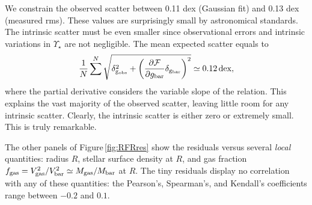 \documentclass[apjl, twocolappendix]{emulateapj}
\begin{document}
We constrain the observed scatter between 0.11 dex (Gaussian fit) and 0.13 dex (measured rms). These values are surprisingly small by astronomical standards. The intrinsic scatter must be even smaller since observational errors and intrinsic variations in $\Upsilon_{\star}$ are not negligible. The mean expected scatter equals to
\begin{equation}
 \dfrac{1}{N}\sum^{N}\sqrt{\delta_{\rm g_{\rm obs}}^2 + \bigg(\dfrac{\partial \mathcal{F}}{\partial g_{\rm bar}} \delta_{\rm g_{\rm bar}}\bigg)^{2}} \simeq 0.12 \, \rm{dex},
\end{equation}
where the partial derivative considers the variable slope of the relation. This explains the vast majority of the observed scatter, leaving little room for any intrinsic scatter. Clearly, the intrinsic scatter is either zero or extremely small. This is truly remarkable.

The other panels of Figure\,\ref{fig:RFRres} show the residuals versus several \textit{local} quantities: radius $R$, stellar surface density at $R$, and gas fraction $f_{\rm gas} = V_{\rm gas}^{2} / V_{\rm bar}^{2} \simeq M_{\rm gas}/M_{\rm bar}$ at $R$. The tiny residuals display no correlation with any of these quantities: the Pearson's, Spearman's, and Kendall's coefficients range between $-0.2$ and $0.1$. 
\end{document}
